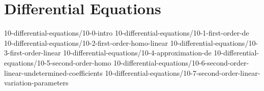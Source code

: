 \chapter{Differential Equations}\label{chap:DifferentialEquations}
	{10-differential-equations/10-0-intro}
	{10-differential-equations/10-1-first-order-de}
	{10-differential-equations/10-2-first-order-homo-linear}
	{10-differential-equations/10-3-first-order-linear}
	{10-differential-equations/10-4-approximation-de}
	{10-differential-equations/10-5-second-order-homo}
	{10-differential-equations/10-6-second-order-linear-undetermined-coefficients}
	{10-differential-equations/10-7-second-order-linear-variation-parameters}
%
%	
%
